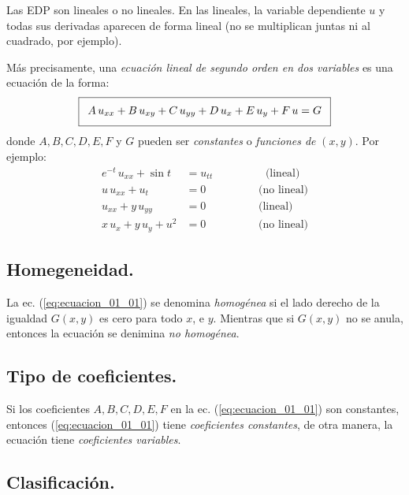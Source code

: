 \documentclass[12pt]{article}
\numberwithin{equation}{section}
\begin{document}
Las EDP son lineales o no lineales. En las lineales, la variable dependiente $u$ y todas sus derivadas aparecen de forma lineal (no se multiplican juntas ni al cuadrado, por ejemplo).
\par
Más precisamente, una \emph{ecuación lineal de segundo orden en dos variables} es una ecuación de la forma:
\begin{align}
\addtolength{\fboxsep}{5pt}\boxed{ A \, u_{xx} + B \, u_{xy} + C \, u_{yy} + D \, u_{x} + E \, u_{y} + F \, u = G}
\label{eq:ecuacion_01_01}
\end{align}
donde $A, B, C, D, E, F$ y $G$ pueden ser \emph{constantes} o \emph{funciones de} $(x, y)$. Por ejemplo:
\begin{align*}
e^{-t} \, u_{xx} + \sin t &= u_{tt} \hspace{2cm} \mbox{(lineal)} \\[0.5em]
u \, u_{xx} + u_{t} &= 0 \hspace{2cm} \mbox{(no lineal)} \\[0.5em]
u_{xx} + y \, u_{yy} &= 0 \hspace{2cm} \mbox{(lineal)} \\[0.5em]
x \, u_{x} + y \, u_{y} + u^{2} &= 0 \hspace{2cm} \mbox{(no lineal)}
\end{align*}

\subsection{Homegeneidad.}

La ec. (\ref{eq:ecuacion_01_01}) se denomina \emph{homogénea} si el lado derecho de la igualdad $G(x, y)$ es cero para todo $x$, e $y$. Mientras que si $G(x, y)$ no se anula, entonces la ecuación se denimina \emph{no homogénea}.

\subsection{Tipo de coeficientes.}

Si los coeficientes $A, B, C, D, E, F$ en la ec. (\ref{eq:ecuacion_01_01}) son constantes, entonces (\ref{eq:ecuacion_01_01}) tiene \emph{coeficientes constantes}, de otra manera, la ecuación tiene \emph{coeficientes variables}.

\subsection{Clasificación.}
\end{document}
